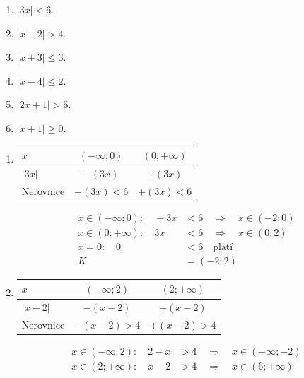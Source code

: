 \documentclass[11pt,a4paper]{article}
\begin{document}
\begin{zadaniReseniBox}[title={Domácí úkol}]
\begin{enumerate}[label=\alph*),itemsep=2pt]
\item $|3x|<6$.
\item $|x-2|>4$.
\item $|x+3|\le3$.
\item $|x-4|\le2$.
\item $|2x+1|>5$.
\item $|x+1|\ge0$.
\end{enumerate}
\tcblower
\begin{enumerate}[label=\alph*),itemsep=1pt]
\item
\begin{center}
\begingroup\footnotesize
\renewcommand{\arraystretch}{1.32}
\begin{tabular}{@{}lcc@{}}
\toprule
$x$ & $(-\infty;0)$ & $(0;+\infty)$ \\
\midrule
$|3 x|$ & $-(3 x)$ & $+(3 x)$ \\
\midrule
Nerovnice & $-(3 x)<6$ & $+(3 x)<6$ \\
\bottomrule
\end{tabular}
\endgroup
\end{center}
\[\begin{aligned}x\in (-\infty;0):\quad - 3 x &< 6\quad\Longrightarrow\quad x\in(-2;0)\\[2pt]
x\in (0;+\infty):\quad 3 x &< 6\quad\Longrightarrow\quad x\in(0;2)\\[2pt]
x=0:\quad 0 &< 6\quad\text{platí}\\[2pt]
K&=(-2;2)\end{aligned}\]
\item
\begin{center}
\begingroup\footnotesize
\renewcommand{\arraystretch}{1.32}
\begin{tabular}{@{}lcc@{}}
\toprule
$x$ & $(-\infty;2)$ & $(2;+\infty)$ \\
\midrule
$|x - 2|$ & $-(x - 2)$ & $+(x - 2)$ \\
\midrule
Nerovnice & $-(x - 2)>4$ & $+(x - 2)>4$ \\
\bottomrule
\end{tabular}
\endgroup
\end{center}
\[\begin{aligned}x\in (-\infty;2):\quad 2 - x &> 4\quad\Longrightarrow\quad x\in(-\infty;-2)\\[2pt]
x\in (2;+\infty):\quad x - 2 &> 4\quad\Longrightarrow\quad x\in(6;+\infty)\\[2pt]

\end{aligned}\]
\end{enumerate}
\end{zadaniReseniBox}
\end{document}
